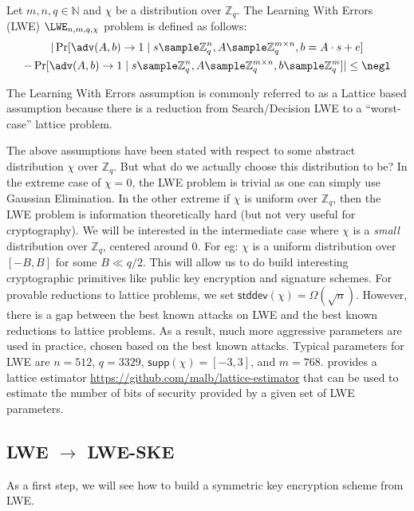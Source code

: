 \begin{definition}
    Let $m,n,q \in \mathbb{N}$ and $\chi$ be a distribution over $\mathbb{Z}_q$. The Learning With Errors (LWE) $\LWE_{n,m,q,\chi}$ problem is defined as follows:
    \begin{multline*}
        |\Pr[\adv(A,b) \to 1 \mid s \sample \mathbb{Z}_q^n, A \sample \mathbb{Z}_q^{m \times n}, b = A \cdot s + e ] \\
        - \Pr[\adv(A,b) \to 1 \mid s \sample \mathbb{Z}_q^n, A \sample \mathbb{Z}_q^{m \times n}, b \sample \mathbb{Z}_q^m ]|\leq \negl
    \end{multline*}
\end{definition}
The Learning With Errors assumption is commonly referred to as a Lattice based assumption because there is a reduction from Search/Decision LWE to a ``worst-case'' lattice problem.

The above assumptions have been stated with respect to some abstract distribution $\chi$ over $\mathbb{Z}_q$. But what do we actually choose this distribution to be? In the extreme case of $\chi = 0$, the LWE problem is trivial as one can simply use Gaussian Elimination. In the other extreme if $\chi$ is uniform over $\mathbb{Z}_q$, then the LWE problem is information theoretically hard (but not very useful for cryptography). We will be interested in the intermediate case where $\chi$ is a \emph{small} distribution over $\mathbb{Z}_q$, centered around 0. For eg: $\chi$ is a uniform distribution over $[-B, B]$ for some $B \ll q/2$. This will allow us to do build interesting cryptographic primitives like public key encryption and signature schemes. For provable reductions to lattice problems, we set $\mathsf{stddev}(\chi) = \Omega(\sqrt{n})$. However, there is a gap between the best known attacks on LWE and the best known reductions to lattice problems. As a result, much more aggressive parameters are used in practice, chosen based on the best known attacks. Typical parameters for LWE are $n = 512$, $q = 3329$, $\mathsf{supp}(\chi) = [-3,3]$, and $m = 768$. \cite{EPRINT:AlbPlaSco15} provides a lattice estimator \url{https://github.com/malb/lattice-estimator} that can be used to estimate the number of bits of security provided by a given set of LWE parameters.

\subsection{LWE $\to$ LWE-SKE}
As a first step, we will see how to build a symmetric key encryption scheme from LWE.

